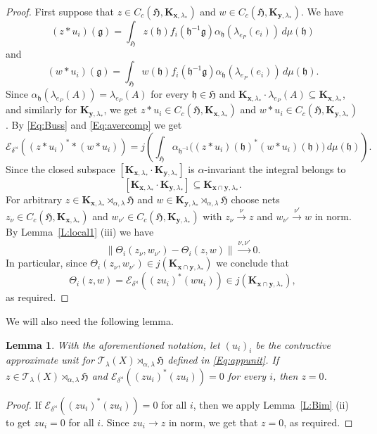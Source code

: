 \documentclass[11pt,final]{amsart}
\numberwithin{equation}{section}
\theoremstyle{plain}
\newtheorem{lemma}[theorem]{Lemma}
\theoremstyle{definition}
\theoremstyle{remark}
\newcommand{\E}{{\mathcal{E}}}
\newcommand{\T}{{\mathcal{T}}}
\def\al{\alpha}
\def\de{\delta}
\def\la{\lambda}
\newcommand{\fg}{{\mathfrak{g}}}
\newcommand{\fH}{{\mathfrak{H}}}
\newcommand{\fh}{{\mathfrak{h}}}
\newcommand{\bo}[1]{\mathbf{#1}} %
\begin{document}
\begin{proof}
First suppose that $z\in C_c(\fH,\bo{K}_{\bo{x},\la_\ast})$ and
$w\in C_c(\fH,\bo{K}_{\bo{y},\la_\ast})$. We have
\[
(z \ast u_i)(\fg)=\int_{\fH}z(\fh) f_i(\fh^{-1}\fg) \al_{\fh}(\la_{e_P}(e_i))\,d\mu(\fh)
\]
and
\[
(w \ast u_i)(\fg)=\int_{\fH}w(\fh)f_i(\fh^{-1}\fg) \al_{\fh}(\la_{e_P}(e_i))\,d\mu(\fh).
\]
Since $\al_{\fh}(\la_{e_P}(A))=\la_{e_P}(A)$ for every $\fh\in \fH$ and $\bo{K}_{\bo{x},\la_\ast} \cdot \la_{e_P}(A) \subseteq \bo{K}_{\bo{x},\la_\ast}$, and similarly for $\bo{K}_{\bo{y},\la_\ast}$, we get $z \ast u_i\in C_c(\fH,\bo{K}_{\bo{x},\la_\ast})$ and $w \ast u_i\in C_c(\fH,\bo{K}_{\bo{y},\la_\ast})$.
By \eqref{Eq:Buss} and \eqref{Eq:avercomp} we get
\[
\E_{\de^{\rtimes}}((z \ast u_i)^* \ast (w\ast u_i))
=
j\left(\int_{\fH}\al_{\fh^{-1}}
\big((z \ast u_i)(\fh)^*(w \ast u_i)(\fh)\big)\,d\mu(\fh)\right).
\]
Since the closed subspace $[\bo{K}_{\bo{x},\la_\ast} \cdot \bo{K}_{\bo{y},\la_\ast} ]$ is $\al$-invariant the integral belongs to
\[
[\bo{K}_{\bo{x},\la_\ast} \cdot \bo{K}_{\bo{y},\la_\ast} ] \subseteq \bo{K}_{\bo{x}\cap \bo{y},\la_\ast}.
\]
For arbitrary
$z\in \bo{K}_{\bo{x},\la_\ast} \rtimes_{\al,\la}\fH$ and
$w\in \bo{K}_{\bo{y},\la_\ast} \rtimes_{\al,\la}\fH$ choose nets
$z_\nu\in C_c(\fH,\bo{K}_{\bo{x},\la_\ast})$ and $w_{\nu'}\in C_c(\fH,\bo{K}_{\bo{y},\la_\ast})$ with $z_\nu \xrightarrow{\nu}z$ and $w_{\nu'} \xrightarrow{\nu'} w$ in norm. By Lemma~\ref{L:local1} (iii) we have
\[
\|\Theta_i(z_\nu,w_{\nu'})-\Theta_i(z,w)\|
\xrightarrow{\nu,\nu'} 0.
\]
In particular, since $\Theta_i(z_\nu,w_{\nu'})\in j(\bo{K}_{\bo{x}\cap \bo{y},\la_\ast})$ we conclude that
\[
\Theta_i(z,w)=\E_{\de^{\rtimes}}((z u_i)^*(w u_i))\in j(\bo{K}_{\bo{x}\cap \bo{y},\la_\ast}),
\]
as required.
\end{proof}

We will also need the following lemma.

\begin{lemma}\label{L:local2}
With the aforementioned notation, let $(u_i)_i$ be the contractive approximate unit for $\T_\la(X)\rtimes_{\al,\la}\fH$ defined in \eqref{Eq:appunit}. If $z\in\T_\la(X) \rtimes_{\al,\la}\fH$ and
$\E_{\de^{\rtimes}}((z u_i)^*(zu_i))=0$
for every $i$,
then $z=0$.
\end{lemma}

\begin{proof}
If $\E_{\de^{\rtimes}}((z u_i)^*(zu_i))=0$ for all $i$, then we apply
Lemma~\ref{L:Bim} (ii) to get $z u_i=0$ for all $i$.
Since $z u_i \to z$ in norm, we get that $z=0$, as required.
\end{proof}
\end{document}
